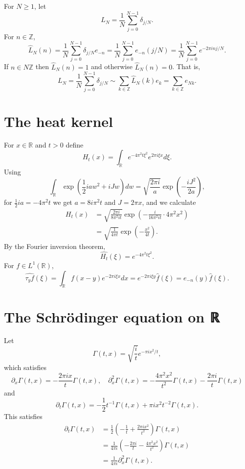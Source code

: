 \documentclass{article}
\theoremstyle{definition}
\begin{document}
For $N \geq 1$, let
\[
L_N = \frac{1}{N} \sum_{j=0}^{N-1} \delta_{j/N}.
\]
For $n \in \mathbb{Z}$,
\[
\widehat{L}_N(n) = \frac{1}{N} \sum_{j=0}^{N-1} \delta_{j/N} e_{-n}
=\frac{1}{N} \sum_{j=0}^{N-1} e_{-n}(j/N) 
=\frac{1}{N} \sum_{j=0}^{N-1} e^{-2\pi inj/N}.
\]
If $n \in N \mathbb{Z}$ then $\widehat{L}_N(n) = 1$ and otherwise
$\widehat{L}_N(n)=0$. 
That is,
\[
L_N =  \frac{1}{N} \sum_{j=0}^{N-1} \delta_{j/N} \sim \sum_{k \in \mathbb{Z}} 
\widehat{L}_N(k) e_k
=\sum_{k \in \mathbb{Z}} e_{Nk}.
\]





\section{The heat kernel}
For $x \in \mathbb{R}$ and $t>0$ define
\[
H_t(x) = \int_{\mathbb{R}} e^{-4\pi^2 t \xi^2} e^{2\pi i\xi x} d\xi.
\]
Using
\[
\int_{\mathbb{R}} \exp\left(\frac{1}{2}iaw^2 + iJw\right) dw = \sqrt{ \frac{2\pi i}{a}} \exp\left(-\frac{iJ^2}{2a}\right),
\]
for $\frac{1}{2}ia =-4\pi^2 t$ we get $a=8i \pi^2 t$ and $J=2\pi x$, and we calculate
\begin{align*}
H_t(x)&=\sqrt{\frac{2\pi i}{8\pi^2 it}} \exp\left( -\frac{i}{16\pi^2 it} \cdot 4\pi^2 x^2\right)\\
&=\sqrt{\frac{1}{4\pi t}} \exp\left(-\frac{x^2}{4t} \right).
\end{align*}
By the Fourier inversion theorem,
\[
\widehat{H_t}(\xi) = e^{-4\pi^2 t\xi^2}.
\]
For $f \in L^1(\mathbb{R})$, 
\[
\widehat{\tau_y f}(\xi) = \int_{\mathbb{R}} f(x-y) e^{-2\pi i\xi x} dx
=e^{-2\pi i\xi y} \widehat{f}(\xi) = e_{-n}(y) \widehat{f}(\xi).
\]




\section{The Schrödinger equation on ℝ}
Let
\[
\Gamma(t,x) =\sqrt{\frac{i}{t}} e^{-\pi ix^2/t},
\]
which satisfies
\[
\partial_x \Gamma(t,x) = -\frac{2\pi ix}{t} \Gamma(t,x),
\quad \partial_x^2 \Gamma(t,x) = -\frac{4\pi^2 x^2}{t^2} \Gamma(t,x)
-\frac{2\pi i}{t} \Gamma(t,x)
\]
and
\[
\partial_t \Gamma(t,x) = -\frac{1}{2} t^{-1} \Gamma(t,x)+ \pi i x^2 t^{-2} \Gamma(t,x).
\]
This satisfies
\begin{align*}
\partial_t \Gamma(t,x)&=\frac{1}{2}  \left(-\frac{1}{t} + \frac{2\pi i x^2}{t^2}\right)\Gamma(t,x)\\
&=\frac{1}{4\pi i} \left( -\frac{2\pi i}{t} - \frac{4\pi^2x^2}{t^2}\right)\Gamma(t,x)\\
&=\frac{1}{4\pi i} \partial_x^2 \Gamma(t,x).
\end{align*}
\end{document}

